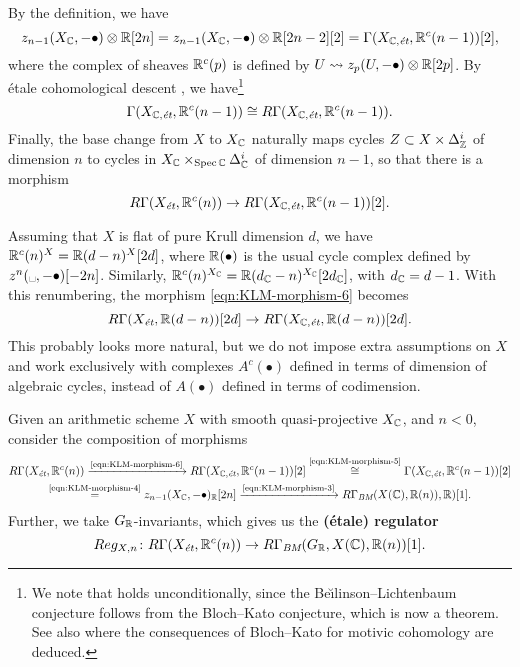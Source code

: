 \documentclass{article}
\numberwithin{equation}{section}
\begin{document}
By the definition, we have
\begin{equation}
  \label{eqn:KLM-morphism-4}
  z_{n-1} (X_\CC, -\bullet) \otimes \RR [2n] =
  z_{n-1} (X_\CC, -\bullet) \otimes \RR [2n-2] [2] =
  \Gamma (X_{\CC,\et}, \RR^c (n-1)) [2],
\end{equation}
where the complex of sheaves $\RR^c (p)$ is defined by
$U \rightsquigarrow z_p (U, -\bullet) \otimes \RR [2p]$.
By étale cohomological descent \cite[Theorem~3.1]{Geisser-2010},
we have\footnote{We note that \cite[Theorem~3.1]{Geisser-2010} holds
  unconditionally, since the Be\u{\i}linson--Lichtenbaum conjecture follows from
  the Bloch--Kato conjecture, which is now a theorem. See also
  \cite{Geisser-2004-Dedekind} where the consequences of Bloch--Kato for motivic
  cohomology are deduced.}
\begin{equation}
  \label{eqn:KLM-morphism-5}
  \Gamma (X_{\CC,\et}, \RR^c (n-1)) \cong R\Gamma (X_{\CC,\et}, \RR^c (n-1)).
\end{equation}
Finally, the base change from $X$ to $X_\CC$ naturally maps cycles
$Z \subset X \times \Delta_\ZZ^i$ of dimension $n$ to cycles in
$X_\CC \times_{\Spec \CC} \Delta_\CC^i$ of dimension $n-1$, so that there is a
morphism
\begin{equation}
  \label{eqn:KLM-morphism-6}
  R\Gamma (X_\et, \RR^c (n)) \to R\Gamma (X_{\CC,\et}, \RR^c (n-1)) [2].
\end{equation}

\begin{remark}
  Assuming that $X$ is flat of pure Krull dimension $d$, we have
  $\RR^c (n)^X = \RR (d-n)^X [2d]$, where $\RR (\bullet)$ is the usual cycle
  complex defined by $z^n (\text{\textvisiblespace}, -\bullet) [-2n]$.
  Similarly, $\RR^c (n)^{X_\CC} = \RR (d_\CC-n)^{X_\CC} [2d_\CC]$, with
  $d_\CC = d - 1$. With this renumbering, the morphism
  \eqref{eqn:KLM-morphism-6} becomes
  $$R\Gamma (X_\et, \RR (d-n)) [2d] \to R\Gamma (X_{\CC,\et}, \RR (d-n)) [2d].$$
  This probably looks more natural, but we do not impose extra assumptions on
  $X$ and work exclusively with complexes $A^c (\bullet)$ defined in terms of
  dimension of algebraic cycles, instead of $A (\bullet)$ defined in terms of
  codimension.
\end{remark}

\begin{definition}
  Given an arithmetic scheme $X$ with smooth quasi-projective $X_\CC$, and
  $n < 0$, consider the composition of morphisms
  \begin{multline*}
    R\Gamma (X_\et, \RR^c (n)) \xrightarrow{\text{\eqref{eqn:KLM-morphism-6}}}
    R\Gamma (X_{\CC,\et}, \RR^c (n-1)) [2] \stackrel{\text{\eqref{eqn:KLM-morphism-5}}}{\cong}
    \Gamma (X_{\CC,\et}, \RR^c (n-1)) [2] \\
    \stackrel{\text{\eqref{eqn:KLM-morphism-4}}}{=}
    z_{n-1} (X_\CC, -\bullet)_\RR [2n] \xrightarrow{\text{\eqref{eqn:KLM-morphism-3}}}
    R\Gamma_\BM (X (\CC), \RR (n)), \RR) [1].
  \end{multline*}
  Further, we take $G_\RR$-invariants, which gives us the
  \textbf{(étale) regulator}
  \[ Reg_{X,n}\colon R\Gamma (X_\et, \RR^c (n)) \to
    R\Gamma_\BM (G_\RR, X(\CC), \RR (n)) [1]. \]
\end{definition}
\end{document}
